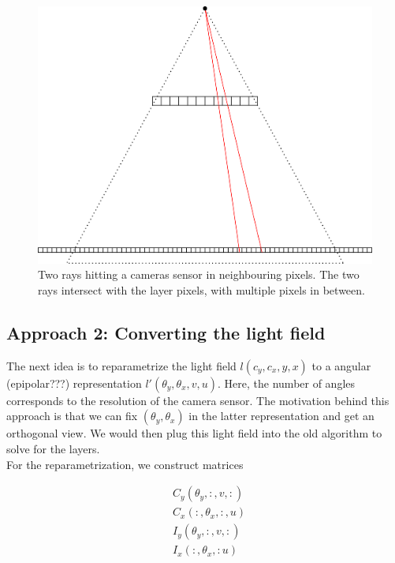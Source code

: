\documentclass[11pt,a4paper,titlepage]{article}
\begin{document}
\begin{figure}[h]
	\centering
	\includegraphics[scale=0.5]{sketches/problem_camera_to_layers.png} 
	\caption{Two rays hitting a cameras sensor in neighbouring pixels. The two rays intersect with the layer pixels, with multiple pixels in between.}
	\label{fig:problem_camera_to_layers}
\end{figure}

\subsection{Approach 2: Converting the light field}
The next idea is to reparametrize the light field $l \left( c_y, c_x, y, x \right)$ to a angular (epipolar???) representation $l' \left( \theta_y, \theta_x, v, u \right)$. Here, the number of angles corresponds to the resolution of the camera sensor. The motivation behind this approach is that we can fix 
$\left( \theta_y, \theta_x \right)$ in the latter representation and get an orthogonal view. We would then plug this light field into the old algorithm to solve for the layers.
\\
For the reparametrization, we construct matrices

\begin{align*}
	& C_y \left( \theta_y, :, v, : \right) \\
	& C_x \left( :, \theta_x, :, u \right) \\
	& I_y \left(\theta_y, :, v, : \right) \\
	& I_x \left( :, \theta_x, : u \right) 
\end{align*}
\end{document}
